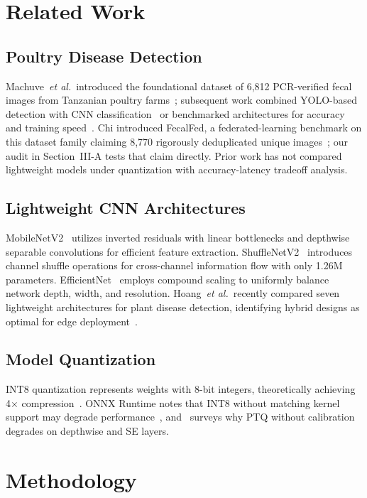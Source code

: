 \documentclass[conference,a4paper]{IEEEtran}
\begin{document}
\section{Related Work}

\subsection{Poultry Disease Detection}
Machuve~\textit{et al.}~introduced the foundational dataset of 6,812 PCR-verified fecal images from Tanzanian poultry farms~\cite{machuve2022}; subsequent work combined YOLO-based detection with CNN classification~\cite{dhungana2025,degu2023} or benchmarked architectures for accuracy and training speed~\cite{tasdelen2025}. Chi introduced FecalFed, a federated-learning benchmark on this dataset family claiming 8,770 rigorously deduplicated unique images~\cite{chi2026}; our audit in Section~III-A tests that claim directly. Prior work has not compared lightweight models under quantization with accuracy-latency tradeoff analysis.

\subsection{Lightweight CNN Architectures}
MobileNetV2~\cite{mobilenetv2} utilizes inverted residuals with linear bottlenecks and depthwise separable convolutions for efficient feature extraction. ShuffleNetV2~\cite{shufflenetv2} introduces channel shuffle operations for cross-channel information flow with only 1.26M parameters. EfficientNet~\cite{efficientnet} employs compound scaling to uniformly balance network depth, width, and resolution. Hoang~\textit{et al.}~recently compared seven lightweight architectures for plant disease detection, identifying hybrid designs as optimal for edge deployment~\cite{hoang2026}.

\subsection{Model Quantization}
INT8 quantization represents weights with 8-bit integers, theoretically achieving 4$\times$ compression~\cite{jacob2018}. ONNX Runtime notes that INT8 without matching kernel support may degrade performance~\cite{onnxruntime2024}, and~\cite{nagel2021} surveys why PTQ without calibration degrades on depthwise and SE layers.

\section{Methodology}
\end{document}
